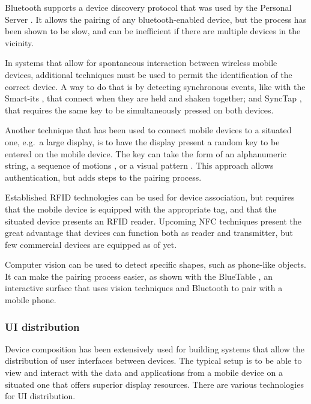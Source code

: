 Bluetooth \citeyearpar{bluetooth} supports a device discovery protocol that was used by the Personal Server \citep{Want:2002:personalserver}.
It allows the pairing of any bluetooth-enabled device, but the process has been shown to be slow, and can be inefficient if there are multiple devices in the vicinity.

In systems that allow for spontaneous interaction between wireless mobile devices, additional techniques must be used to permit the identification of the correct device.
A way to do that is by detecting synchronous events, like with the Smart-its \citep{Holmquist:2001:smartits}, that connect when they are held and shaken together; and SyncTap \citep{Rekimoto:2003:synctap}, that requires the same key to be simultaneously pressed on both devices.

Another technique that has been used to connect mobile devices to a situated one, e.g.\ a large display, is to have the display present a random key to be entered on the mobile device.
The key can take the form of an alphanumeric string, a sequence of motions \citep{Patel:2004:mobileauth}, or a visual pattern \citep{Ballagas:2005:sweeppointshoot, Scott:2005:visualauth}.
This approach allows authentication, but adds steps to the pairing process.

Established RFID technologies can be used for device association, but requires that the mobile device is equipped with the appropriate tag, and that the situated device presents an RFID reader.
Upcoming NFC techniques present the great advantage that devices can function both as reader and transmitter, but few commercial devices are equipped as of yet.

Computer vision can be used to detect specific shapes, such as phone-like objects.
It can make the pairing process easier, as shown with the BlueTable \citep{Wilson:2007:bluetable}, an interactive surface that uses vision techniques and Bluetooth to pair with a mobile phone.

\subsubsection{UI distribution}

Device composition has been extensively used for building systems that allow the distribution of user interfaces between devices.
The typical setup is to be able to view and interact with the data and applications from a mobile device on a situated one that offers superior display resources.
There are various technologies for UI distribution.

